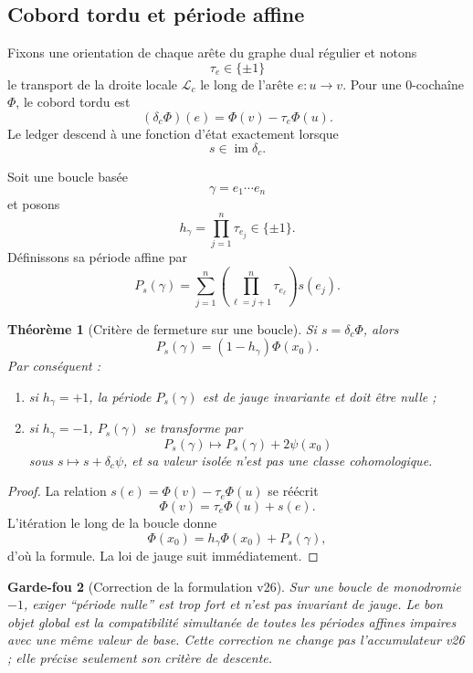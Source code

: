 \documentclass[11pt,a4paper]{article}
\newtheorem{theorem}{Théorème}[section]
\newtheorem{guardrail}[theorem]{Garde-fou}
\begin{document}
\subsection{Cobord tordu et période affine}

Fixons une orientation de chaque arête du graphe dual régulier et notons
\[
 \tau_e\in\{\pm1\}
\]
le transport de la droite locale $\mathcal L_c$ le long de l'arête $e:u\to v$. Pour une $0$-cochaîne $\Phi$, le cobord tordu est
\begin{equation}\label{eq:v27-twisted-coboundary}
 \boxed{
 (\delta_c\Phi)(e)
 =
 \Phi(v)-\tau_e\Phi(u).}
\end{equation}
Le ledger descend à une fonction d'état exactement lorsque
\[
 \boxed{s\in\operatorname{im}\delta_c.}
\]

Soit une boucle basée
\[
 \gamma=e_1\cdots e_n
\]
et posons
\[
 h_\gamma=\prod_{j=1}^n\tau_{e_j}\in\{\pm1\}.
\]
Définissons sa période affine par
\begin{equation}\label{eq:v27-affine-period}
 \boxed{
 P_s(\gamma)
 =
 \sum_{j=1}^n
 \left(\prod_{\ell=j+1}^n\tau_{e_\ell}\right)s(e_j).}
\end{equation}

\begin{theorem}[Critère de fermeture sur une boucle]\label{thm:v27-loop-criterion}
Si $s=\delta_c\Phi$, alors
\begin{equation}\label{eq:v27-loop-exact}
 \boxed{
 P_s(\gamma)
 =
 (1-h_\gamma)\Phi(x_0).}
\end{equation}
Par conséquent :
\begin{enumerate}[label=\textup{(\roman*)}]
\item si $h_\gamma=+1$, la période $P_s(\gamma)$ est de jauge invariante et doit être nulle ;
\item si $h_\gamma=-1$, $P_s(\gamma)$ se transforme par
\[
 P_s(\gamma)\mapsto P_s(\gamma)+2\psi(x_0)
\]
sous $s\mapsto s+\delta_c\psi$, et sa valeur isolée n'est pas une classe cohomologique.
\end{enumerate}
\end{theorem}

\begin{proof}
La relation $s(e)=\Phi(v)-\tau_e\Phi(u)$ se réécrit
\[
 \Phi(v)=\tau_e\Phi(u)+s(e).
\]
L'itération le long de la boucle donne
\[
 \Phi(x_0)=h_\gamma\Phi(x_0)+P_s(\gamma),
\]
d'où la formule. La loi de jauge suit immédiatement.
\end{proof}

\begin{guardrail}[Correction de la formulation v26]
Sur une boucle de monodromie $-1$, exiger ``période nulle'' est trop fort et n'est pas invariant de jauge. Le bon objet global est la compatibilité simultanée de toutes les périodes affines impaires avec une même valeur de base. Cette correction ne change pas l'accumulateur v26 ; elle précise seulement son critère de descente.
\end{guardrail}
\end{document}
